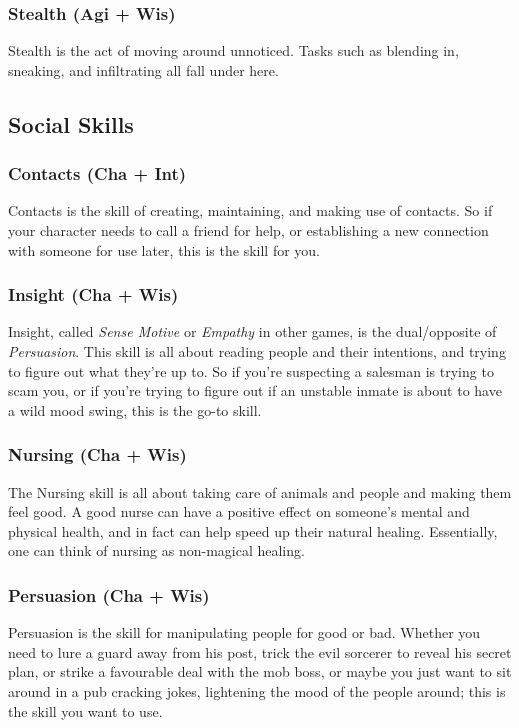 \subsubsection{Stealth (Agi + Wis)}
Stealth is the act of moving around unnoticed.
Tasks such as blending in, sneaking, and infiltrating all fall under here.

\subsection{Social Skills}
\subsubsection{Contacts (Cha + Int)}
Contacts is the skill of creating, maintaining, and making use of contacts.
So if your character needs to call a friend for help, or establishing a new connection with someone for use later, this is the skill for you.

\subsubsection{Insight (Cha + Wis)}
Insight, called \textit{Sense Motive} or \textit{Empathy} in other games, is the dual/opposite of \textit{Persuasion}. 
This skill is all about reading people and their intentions, and trying to figure out what they're up to.
So if you're suspecting a salesman is trying to scam you, or if you're trying to figure out if an unstable inmate is about to have a wild mood swing, this is the go-to skill.

\subsubsection{Nursing (Cha + Wis)}
The Nursing skill is all about taking care of animals and people and making them feel good.
A good nurse can have a positive effect on someone's mental and physical health, and in fact can help speed up their natural healing.
Essentially, one can think of nursing as non-magical healing.

\subsubsection{Persuasion (Cha + Wis)}
Persuasion is the skill for manipulating people for good or bad.
Whether you need to lure a guard away from his post, trick the evil sorcerer to reveal his secret plan, or strike a favourable deal with the mob boss, or maybe you just want to sit around in a pub cracking jokes, lightening the mood of the people around; this is the skill you want to use.

